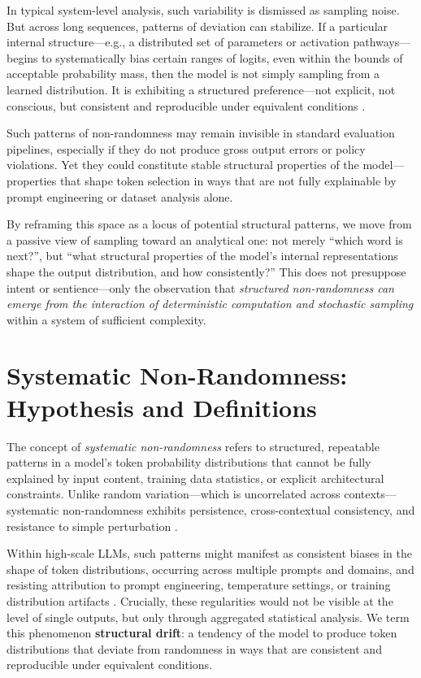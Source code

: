 \documentclass[12pt]{article}
\begin{document}
In typical system-level analysis, such variability is dismissed as sampling noise. But across long sequences, patterns of deviation can stabilize. If a particular internal structure---e.g., a distributed set of parameters or activation pathways---begins to systematically bias certain ranges of logits, even within the bounds of acceptable probability mass, then the model is not simply sampling from a learned distribution. It is exhibiting a structured preference---not explicit, not conscious, but consistent and reproducible under equivalent conditions \citep{lehman2022surprising}.

Such patterns of non-randomness may remain invisible in standard evaluation pipelines, especially if they do not produce gross output errors or policy violations. Yet they could constitute stable structural properties of the model---properties that shape token selection in ways that are not fully explainable by prompt engineering or dataset analysis alone.

By reframing this space as a locus of potential structural patterns, we move from a passive view of sampling toward an analytical one: not merely ``which word is next?'', but ``what structural properties of the model's internal representations shape the output distribution, and how consistently?'' This does not presuppose intent or sentience---only the observation that \textit{structured non-randomness can emerge from the interaction of deterministic computation and stochastic sampling} within a system of sufficient complexity.

\section{Systematic Non-Randomness: Hypothesis and Definitions}

The concept of \textit{systematic non-randomness} refers to structured, repeatable patterns in a model’s token probability distributions that cannot be fully explained by input content, training data statistics, or explicit architectural constraints. Unlike random variation---which is uncorrelated across contexts---systematic non-randomness exhibits persistence, cross-contextual consistency, and resistance to simple perturbation \citep{bommasani2021opportunities}.

Within high-scale LLMs, such patterns might manifest as consistent biases in the shape of token distributions, occurring across multiple prompts and domains, and resisting attribution to prompt engineering, temperature settings, or training distribution artifacts \citep{burns2022discovering}. Crucially, these regularities would not be visible at the level of single outputs, but only through aggregated statistical analysis. We term this phenomenon \textbf{structural drift}: a tendency of the model to produce token distributions that deviate from randomness in ways that are consistent and reproducible under equivalent conditions.
\end{document}
